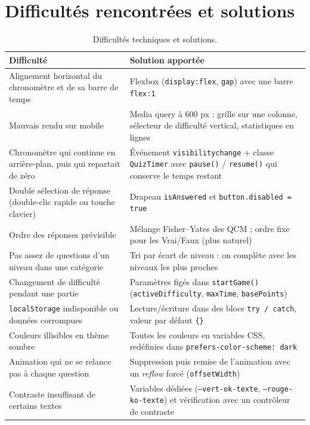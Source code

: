 \documentclass[11pt,a4paper]{article}
\begin{document}
\section{Difficultés rencontrées et solutions}
\begin{table}[H]
\centering
\renewcommand{\arraystretch}{1.35}
\small
\begin{tabularx}{\linewidth}{@{}>{\raggedright\arraybackslash}p{5cm} X@{}}
\toprule
\textbf{Difficulté} & \textbf{Solution apportée} \\
\midrule
Alignement horizontal du chronomètre et de sa barre de temps & Flexbox (\texttt{display:flex}, \texttt{gap}) avec une barre \texttt{flex:1} \\
Mauvais rendu sur mobile & Media query à 600 px : grille sur une colonne, sélecteur de difficulté vertical, statistiques en lignes \\
Chronomètre qui continue en arrière-plan, puis qui repartait de zéro & Événement \texttt{visibilitychange} + classe \texttt{QuizTimer} avec \texttt{pause()} / \texttt{resume()} qui conserve le temps restant \\
Double sélection de réponse (double-clic rapide ou touche clavier) & Drapeau \texttt{isAnswered} et \texttt{button.disabled = true} \\
Ordre des réponses prévisible & Mélange Fisher--Yates des QCM ; ordre fixe pour les Vrai/Faux (plus naturel) \\
Pas assez de questions d'un niveau dans une catégorie & Tri par écart de niveau : on complète avec les niveaux les plus proches \\
Changement de difficulté pendant une partie & Paramètres figés dans \texttt{startGame()} (\texttt{activeDifficulty}, \texttt{maxTime}, \texttt{basePoints}) \\
\texttt{localStorage} indisponible ou données corrompues & Lecture/écriture dans des blocs \texttt{try / catch}, valeur par défaut \texttt{\{\}} \\
Couleurs illisibles en thème sombre & Toutes les couleurs en variables CSS, redéfinies dans \texttt{prefers-color-scheme: dark} \\
Animation qui ne se relance pas à chaque question & Suppression puis remise de l'animation avec un \textit{reflow} forcé (\texttt{offsetWidth}) \\
Contraste insuffisant de certains textes & Variables dédiées (\texttt{--vert-ok-texte}, \texttt{--rouge-ko-texte}) et vérification avec un contrôleur de contraste \\
\bottomrule
\end{tabularx}
\caption{Difficultés techniques et solutions.}
\end{table}
\end{document}
